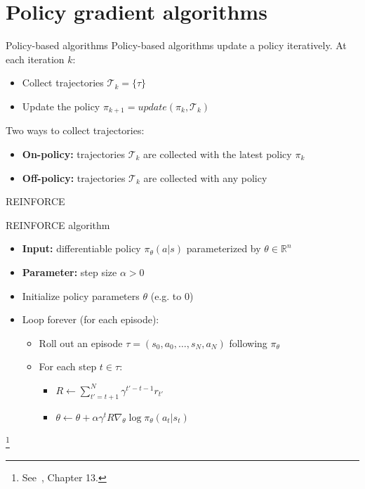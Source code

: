 \documentclass[11pt, aspectratio=169]{beamer}
\newcommand\blfootnote[1]{%
  \begingroup
  \renewcommand\thefootnote{}%
  \footnote{#1}%
  \addtocounter{footnote}{-1}%
  \endgroup
}
\begin{document}
\section{Policy gradient algorithms}

\begin{frame}{Policy-based algorithms}
    Policy-based algorithms update a policy iteratively. At each iteration $k$:
    \begin{itemize}
        \item Collect trajectories $\mathcal{T}_k = \{ \tau \}$
        \item Update the policy $\pi_{k+1} = \mathit{update}(\pi_k, \mathcal{T}_k)$
    \end{itemize}
    Two ways to collect trajectories:
    \begin{itemize}
        \item \textbf{On-policy:} trajectories $\mathcal{T}_k$ are collected with the latest policy $\pi_k$
        \item \textbf{Off-policy:} trajectories $\mathcal{T}_k$ are collected with any policy
    \end{itemize}
\end{frame}

\begin{frame}{REINFORCE}
    \begin{block}{REINFORCE algorithm}
        \begin{itemize}
            \item \textbf{Input:} differentiable policy $\pi_\theta(a | s)$ parameterized by $\theta \in \mathbb{R}^n$
            \item \textbf{Parameter:} step size $\alpha > 0$
            \item Initialize policy parameters $\theta$ (e.g. to $0$)
            \item Loop forever (for each episode):
                \begin{itemize}
                    \item Roll out an episode $\tau = (s_0, a_0, \ldots, s_{N}, a_{N})$ following $\pi_\theta$
                    \item For each step $t \in \tau$:
                        \begin{itemize}
                            \item $R \leftarrow \sum_{t' = t + 1}^N \gamma^{t' - t - 1} r_{t'}$
                            \item $\theta \leftarrow \theta + \alpha \gamma^t R \nabla_\theta \log \pi_\theta(a_t | s_t)$
                        \end{itemize}
                \end{itemize}
        \end{itemize}
    \end{block}
    \blfootnote{
        See~\cite{sutton2018}, Chapter 13.
    }
\end{frame}
\end{document}
